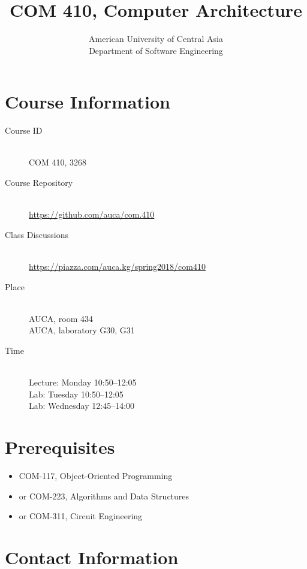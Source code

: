 \documentclass[12pt,a4paper,oneside]{article}
\begin{document}
    \title{COM 410, Computer Architecture}
    \author{
        American University of Central Asia\\
        Department of Software Engineering
    }
    \date{}
    \maketitle

    \section{Course Information}

        \begin{description}
            \item[Course ID]\hfill\\
                COM 410, 3268
            \item[Course Repository]\hfill\\
                \url{https://github.com/auca/com.410}
            \item[Class Discussions]\hfill\\
                \url{https://piazza.com/auca.kg/spring2018/com410}
            \item[Place]\hfill\\
                AUCA, room 434\\
                AUCA, laboratory G30, G31
            \item[Time]\hfill\\
                Lecture: Monday 10:50--12:05\\
                Lab: Tuesday 10:50--12:05\\
                Lab: Wednesday 12:45--14:00
        \end{description}

    \section{Prerequisites}

        \begin{itemize}
            \item COM-117, Object-Oriented Programming
            \item or COM-223, Algorithms and Data Structures
            \item or COM-311, Circuit Engineering
        \end{itemize}

    \section{Contact Information}
\end{document}
